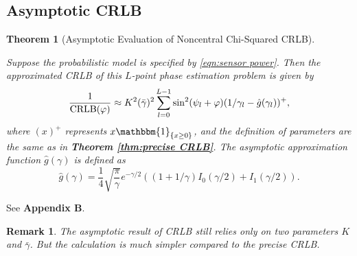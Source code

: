 \documentclass[12pt,draftclsnofoot,journal,onecolumn]{IEEEtran}
\newtheorem{theorem}{\bf Theorem}
\newtheorem{remark}{\bf Remark}
\theoremstyle{nonumberplain}
\begin{document}
\subsection{Asymptotic CRLB}
    \begin{theorem}[Asymptotic Evaluation of Noncentral Chi-Squared CRLB] \label{thm:asymptotic CRLB} \mbox{}\par
        Suppose the probabilistic model is specified by \eqref{eqn:sensor power}. Then the approximated CRLB of this $L$-point phase estimation problem is given by 
        \begin{equation}
            \frac{1}{{\rm CRLB}(\varphi)}\approx K^2(\bar{\gamma})^2 \sum_{l=0}^{L-1}\sin^2(\psi_l+\varphi)(1/\gamma_l-\hat{g}(\gamma_l))^{+},
            \label{eqn:asymptotic CRLB}
        \end{equation}
        where $(x)^{+}$ represents ${x{\mathbbm{1}}_{\{x\geq 0\}}}$, and the definition of parameters are the same as in {\bf Theorem \ref{thm:precise CRLB}}. The asymptotic approximation function $\hat{g}(\gamma)$ is defined as 
        \begin{equation}
            \hat{g}(\gamma) = \frac{1}{4} \sqrt{\frac{\pi}{\gamma}}e^{-\gamma/2}\left((1+1/\gamma)I_0(\gamma/2) + I_1(\gamma/2)\right).
            \label{eqn:definition g function}
        \end{equation}
    \end{theorem}
    \begin{IEEEproof}
        See {\bf Appendix B}. 
    \end{IEEEproof}
    \begin{remark}
        The asymptotic result of CRLB still relies only on two parameters $K$ and $\bar{\gamma}$. But the calculation is much simpler compared to the precise CRLB. 
    \end{remark}
\end{document}
